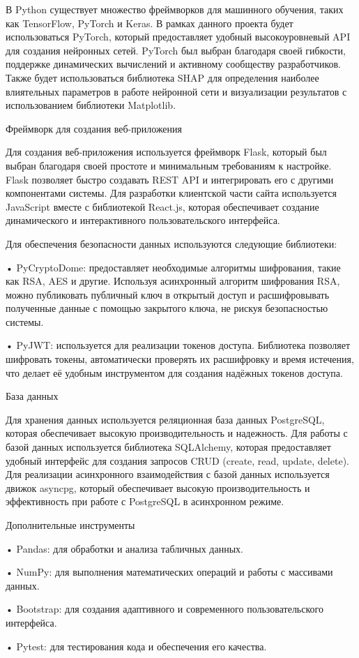 {  \par \redline В Python существует множество фреймворков для машинного обучения, таких как TensorFlow, PyTorch и Keras. В рамках данного проекта будет использоваться PyTorch, который предоставляет удобный высокоуровневый API для создания нейронных сетей. PyTorch был выбран благодаря своей гибкости, поддержке динамических вычислений и активному сообществу разработчиков. Также будет использоваться библиотека SHAP для определения наиболее влиятельных параметров в работе нейронной сети и визуализации результатов с использованием библиотеки Matplotlib.
  \par \redline Фреймворк для создания веб-приложения
  \par \redline Для создания веб-приложения используется фреймворк Flask, который был выбран благодаря своей простоте и минимальным требованиям к настройке. Flask позволяет быстро создавать REST API и интегрировать его с другими компонентами системы. Для разработки клиентской части сайта используется JavaScript вместе с библиотекой React.js, которая обеспечивает создание динамического и интерактивного пользовательского интерфейса.
  \par \redline Для обеспечения безопасности данных используются следующие библиотеки:
  \par \redline • PyCryptoDome: предоставляет необходимые алгоритмы шифрования, такие как RSA, AES и другие. Используя асинхронный алгоритм шифрования RSA, можно публиковать публичный ключ в открытый доступ и расшифровывать полученные данные с помощью закрытого ключа, не рискуя безопасностью системы.
  \par \redline • PyJWT: используется для реализации токенов доступа. Библиотека позволяет шифровать токены, автоматически проверять их расшифровку и время истечения, что делает её удобным инструментом для создания надёжных токенов доступа.
  \par \redline База данных
  \par \redline Для хранения данных используется реляционная база данных PostgreSQL, которая обеспечивает высокую производительность и надежность. Для работы с базой данных используется библиотека SQLAlchemy, которая предоставляет удобный интерфейс для создания запросов CRUD (create, read, update, delete). Для реализации асинхронного взаимодействия с базой данных используется движок asyncpg, который обеспечивает высокую производительность и эффективность при работе с PostgreSQL в асинхронном режиме.
  \par \redline Дополнительные инструменты
  \par \redline • Pandas: для обработки и анализа табличных данных.
  \par \redline • NumPy: для выполнения математических операций и работы с массивами данных.
  \par \redline • Bootstrap: для создания адаптивного и современного пользовательского интерфейса.
  \par \redline • Pytest: для тестирования кода и обеспечения его качества.



  \par
}
